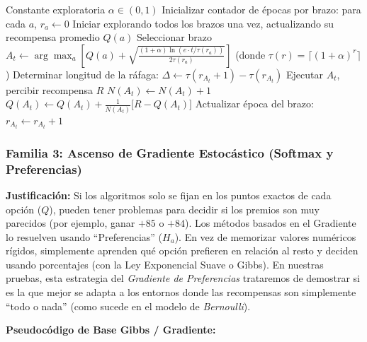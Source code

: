 \begin{algorithm}
\caption{Algoritmo UCB2}
\begin{algorithmic}[1]
\REQUIRE Constante exploratoria $\alpha \in (0, 1)$
\STATE Inicializar contador de épocas por brazo: para cada $a$, $r_a \leftarrow 0$
\STATE Iniciar explorando todos los brazos una vez, actualizando su recompensa promedio $Q(a)$
    \STATE Seleccionar brazo $A_t \leftarrow \arg\max_a \left[ Q(a) + \sqrt{\frac{(1 + \alpha) \ln (e \cdot t / \tau(r_a))}{2 \tau(r_a)}} \right]$ \newline
           (donde $\tau(r) = \lceil (1+\alpha)^r \rceil$)
    \STATE Determinar longitud de la ráfaga: $\Delta \leftarrow \tau(r_{A_t} + 1) - \tau(r_{A_t})$
        \STATE Ejecutar $A_t$, percibir recompensa $R$
        \STATE $N(A_t) \leftarrow N(A_t) + 1$
        \STATE $Q(A_t) \leftarrow Q(A_t) + \frac{1}{N(A_t)} \big[R - Q(A_t)\big]$
    \ENDFOR
    \STATE Actualizar época del brazo: $r_{A_t} \leftarrow r_{A_t} + 1$
\ENDFOR
\end{algorithmic}
\end{algorithm}

\subsubsection{Familia 3: Ascenso de Gradiente Estocástico (Softmax y
Preferencias)}\label{familia-3-ascenso-de-gradiente-estocuxe1stico-softmax-y-preferencias}

\textbf{Justificación:} Si los algoritmos solo se fijan en los puntos
exactos de cada opción (\(Q\)), pueden tener problemas para decidir si
los premios son muy parecidos (por ejemplo, ganar \(+85\) o \(+84\)).
Los métodos basados en el Gradiente lo resuelven usando ``Preferencias''
(\(H_a\)). En vez de memorizar valores numéricos rígidos, simplemente
aprenden qué opción prefieren en relación al resto y deciden usando
porcentajes (con la Ley Exponencial Suave o Gibbs). En nuestras pruebas,
esta estrategia del \emph{Gradiente de Preferencias} trataremos de
demostrar si es la que mejor se adapta a los entornos donde las
recompensas son simplemente ``todo o nada'' (como sucede en el modelo de
\emph{Bernoulli}).

\textbf{Pseudocódigo de Base Gibbs / Gradiente:}

